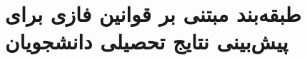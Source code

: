 	\section[ پیش‌بینی نتایج تحصیلی ]{طبقه‌بند مبتنی بر قوانین فازی برای پیش‌بینی نتایج تحصیلی دانشجویان}